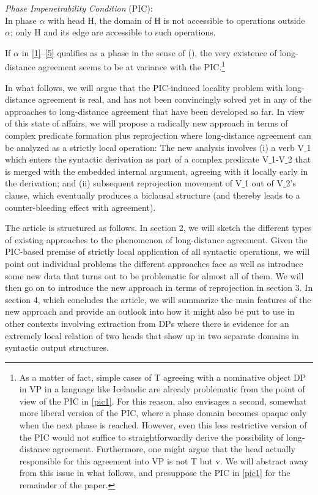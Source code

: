 \documentclass[output=paper
,modfonts
,nonflat]{langsci/langscibook}
\begin{document}
\ea\label{ex:mueller:6} {\itshape Phase Impenetrability Condition} \label{pic1}(PIC):\\
  In phase $\alpha$ with head H, the domain of H is not accessible to
  operations outside $\alpha$; only H and its edge are accessible to such
  operations.
\z


If $\alpha$ in \ref{1}--\ref{5} qualifies as a phase in the sense of
(\Last), the very existence of long-distance agreement seems to be at
variance with the PIC.\footnote{\label{fn1}As a matter of fact, simple cases of T
  agreeing with a nominative object DP in VP in a language like
  Icelandic are already problematic from the point of view of the PIC
  in \ref{pic1}. For this reason, \cite{Chomsky:01} also envisages a
  second, somewhat more liberal version of the PIC, where a phase
  domain becomes opaque only when the next phase is reached. However, even
  this less restrictive version of the PIC would not suffice to
  straightforwardly derive the possibility of long-distance
  agreement. Furthermore, one might argue that the head actually
  responsible for this agreement into VP is not T but v. We will
  abstract away from this issue in what follows, and presuppose the
  PIC in \ref{pic1} for the remainder of the paper.}

In what follows, we will argue that the PIC-induced locality problem
with long-distance agreement is real, and has not been
convincingly solved yet in any of the approaches to long-distance
agreement that have been developed so far. In view of this state of
affairs, we will propose a radically new approach in terms of complex
predicate formation plus reprojection where long-distance agreement
can be analyzed as a strictly local operation: The new analysis  involves (i) a verb
V$\_$1 which enters the syntactic derivation as part of a complex
predicate V$\_$1-V$\_$2 that is merged with the embedded internal argument,
agreeing with it locally early in the derivation; and (ii) subsequent
reprojection movement of V$\_$1 out of V$\_$2's clause, which eventually
produces a biclausal structure (and thereby leads to a
counter-bleeding effect with agreement). 

The article is structured as follows. In section 2, we will sketch the
different types of existing approaches to the phenomenon of
long-distance agreement. Given the PIC-based premise of strictly local
application of all syntactic operations, we will point out individual
problems the different approaches face as well as introduce some new
data that turns out to be problematic for almost all of them. We will
then go on to introduce the new approach in terms of reprojection in
section 3. In section 4, which concludes the article, we will
summarize the main features of the new approach and provide an outlook
into how it might also be put to use in other contexts involving
extraction from DPs where there is evidence for an extremely local
relation of two heads that show up in two separate domains in
syntactic output structures.
  
\end{document}

